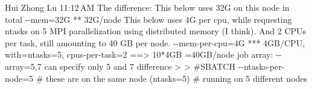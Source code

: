 \documentclass{article}%
\begin{document}
%
Hui Zhong Lu%
\newline%
\newline%
%
11:12 AM%
\newline%
\newline%
%
%
\newline%
\newline%
%
The difference: %
\newline%
\newline%
%
%
\newline%
\newline%
%
This below uses 32G on this node in total%
\newline%
\newline%
%
{-}{-}mem=32G ** 32G/node%
\newline%
\newline%
%
This below uses 4G per cpu, while requesting ntasks on 5 MPI parallelization using distributed memory (I think). And 2 CPUs per task, still amounting to 40 GB per node. %
\newline%
\newline%
%
{-}{-}mem{-}per{-}cpu=4G *** 4GB/CPU, with=ntasks=5, cpus{-}per{-}task=2 ==> 10*4GB =40GB/node%
\newline%
\newline%
%
%
\newline%
\newline%
%
job array:%
\newline%
\newline%
%
{-}{-}array=5,7%
\newline%
\newline%
%
can specify only 5 and 7 %
\newline%
\newline%
%
%
\newline%
\newline%
%
%
\newline%
\newline%
%
difference %
\newline%
\newline%
%
> > \#SBATCH {-}{-}ntasks{-}per{-}node=5 \# these are on the same node%
\newline%
\newline%
%
(ntasks=5) \# running on 5 different nodes %
\newline%
\newline%
%
%
\newline%
\newline%
%
%
\newline%
\newline%
\end{document}
